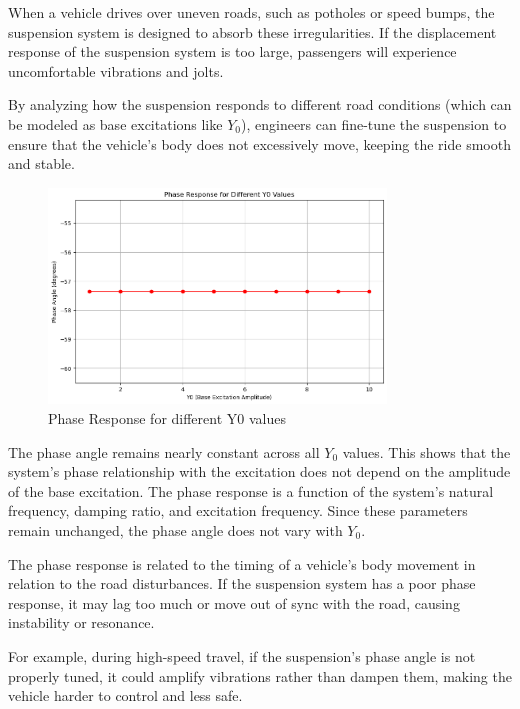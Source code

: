 \documentclass[12pt,a4paper]{article}
\begin{document}
When a vehicle drives over uneven roads, such as potholes or speed bumps, the suspension system is designed to absorb these irregularities. If the displacement response of the suspension system is too large, passengers will experience uncomfortable vibrations and jolts.

By analyzing how the suspension responds to different road conditions (which can be modeled as base excitations like \(Y_0\)), engineers can fine-tune the suspension to ensure that the vehicle's body does not excessively move, keeping the ride smooth and stable.




{\vspace{10pt}}

\begin{figure}[H]
    \centering
    \includegraphics[width=0.8\textwidth]{phase_resp.png} 
    \caption{Phase Response for different Y0 values}
    \label{fig:system}
\end{figure}
{\vspace{10pt}}
The phase angle remains nearly constant across all \(Y_0\) values. This shows that the system's phase relationship with the excitation does not depend on the amplitude of the base excitation. The phase response is a function of the system's natural frequency, damping ratio, and excitation frequency. Since these parameters remain unchanged, the phase angle does not vary with \(Y_0\).

The phase response is related to the timing of a vehicle's body movement in relation to the road disturbances. If the suspension system has a poor phase response, it may lag too much or move out of sync with the road, causing instability or resonance.

For example, during high-speed travel, if the suspension's phase angle is not properly tuned, it could amplify vibrations rather than dampen them, making the vehicle harder to control and less safe.
\end{document}
